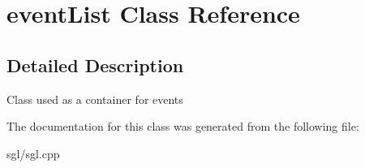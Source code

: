 \hypertarget{classevent_list}{}\section{event\+List Class Reference}
\label{classevent_list}


\subsection{Detailed Description}
Class used as a container for events 

The documentation for this class was generated from the following file\+:\begin{DoxyCompactItemize}
\item 
sgl/sgl.\+cpp\end{DoxyCompactItemize}
